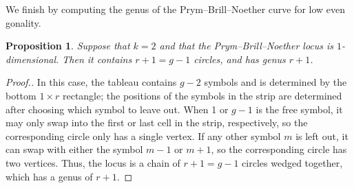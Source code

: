 \documentclass[11pt,reqno]{amsart}
\newcommand{\derek}[1]{{\color{Green} \sf D: [#1]}}
\theoremstyle{definition}
\theoremstyle{problem}
\theoremstyle{plain}
\newtheorem{proposition}[definition]{Proposition}
\theoremstyle{remark}
\theoremstyle{theorem}
\numberwithin{equation}{section}
\numberwithin{figure}{section}
\begin{document}
%

We finish by computing the genus of the Prym--Brill--Noether curve for low even gonality. 
\begin{proposition}\label{prop:k2dim1}
  Suppose that $k=2$ and that the Prym--Brill--Noether locus is $1$-dimensional. Then it contains  $r+1=g-1$ circles, and has genus $r+1$.
\end{proposition}

\begin{proof}[Proof.]
  In this case, the tableau contains $g-2$ symbols and is determined by the bottom $1\times r$ rectangle; the positions of the symbols in the strip are determined after choosing which symbol to leave out.  When 1 or $g-1$ is the free symbol, it may only swap into the first or last cell in the strip,   respectively, so the corresponding circle only has a single vertex. If any other symbol $m$ is left out,  it can swap with either the symbol $m-1$ or $m+1$, so the corresponding circle has two vertices. Thus, the locus is a chain of $r+1=g-1$ circles wedged together, which has a genus of $r+1$.
\end{proof}
\end{document}
